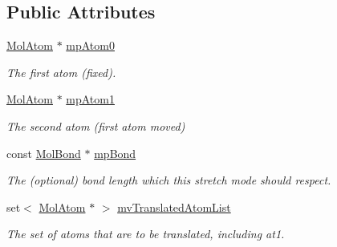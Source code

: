 \subsection*{Public Attributes}
\begin{DoxyCompactItemize}
\item 
\mbox{\label{struct_obj_cryst_1_1_stretch_mode_bond_length_a3ddf1478c2b932ad976d33eda56dd35a}} 
\mbox{\hyperlink{class_obj_cryst_1_1_mol_atom}{Mol\+Atom}} $\ast$ \mbox{\hyperlink{struct_obj_cryst_1_1_stretch_mode_bond_length_a3ddf1478c2b932ad976d33eda56dd35a}{mp\+Atom0}}
\begin{DoxyCompactList}\small\item\em The first atom (fixed). \end{DoxyCompactList}\item 
\mbox{\label{struct_obj_cryst_1_1_stretch_mode_bond_length_aef858d1c7ca2ee9c09e88f8464337b31}} 
\mbox{\hyperlink{class_obj_cryst_1_1_mol_atom}{Mol\+Atom}} $\ast$ \mbox{\hyperlink{struct_obj_cryst_1_1_stretch_mode_bond_length_aef858d1c7ca2ee9c09e88f8464337b31}{mp\+Atom1}}
\begin{DoxyCompactList}\small\item\em The second atom (first atom moved) \end{DoxyCompactList}\item 
\mbox{\label{struct_obj_cryst_1_1_stretch_mode_bond_length_a6fc92ed5334db0589d860f32254cac93}} 
const \mbox{\hyperlink{class_obj_cryst_1_1_mol_bond}{Mol\+Bond}} $\ast$ \mbox{\hyperlink{struct_obj_cryst_1_1_stretch_mode_bond_length_a6fc92ed5334db0589d860f32254cac93}{mp\+Bond}}
\begin{DoxyCompactList}\small\item\em The (optional) bond length which this stretch mode should respect. \end{DoxyCompactList}\item 
\mbox{\label{struct_obj_cryst_1_1_stretch_mode_bond_length_ac18eef8c47f6ac752c00f1f93216a6ee}} 
set$<$ \mbox{\hyperlink{class_obj_cryst_1_1_mol_atom}{Mol\+Atom}} $\ast$ $>$ \mbox{\hyperlink{struct_obj_cryst_1_1_stretch_mode_bond_length_ac18eef8c47f6ac752c00f1f93216a6ee}{mv\+Translated\+Atom\+List}}
\begin{DoxyCompactList}\small\item\em The set of atoms that are to be translated, including at1. \end{DoxyCompactList}\end{DoxyCompactItemize}


